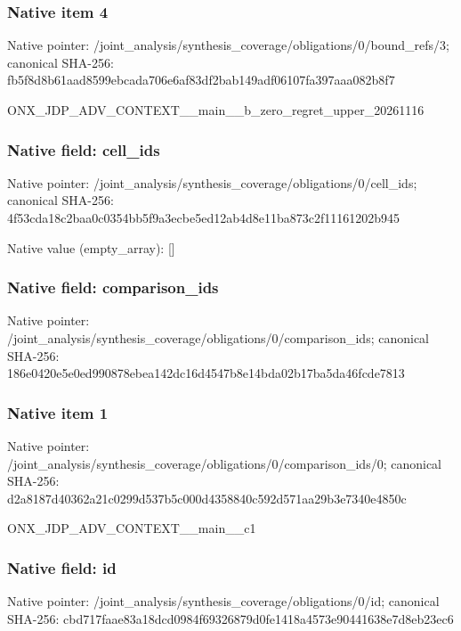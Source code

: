 \documentclass[10pt,a4paper]{article}
\begin{document}
\subsubsection{Native item 4}
Native pointer: /joint\_\allowbreak{}analysis/synthesis\_\allowbreak{}coverage/obligations/0/bound\_\allowbreak{}refs/3; canonical SHA-256: fb5f8d8b61aad8599ebcada706e6af83df2bab149adf06107fa397aaa082b8f7

\begingroup\raggedright\sloppy ONX\_\allowbreak{}JDP\_\allowbreak{}ADV\_\allowbreak{}CONTEXT\_\allowbreak{}\_\allowbreak{}main\_\allowbreak{}\_\allowbreak{}b\_\allowbreak{}zero\_\allowbreak{}regret\_\allowbreak{}upper\_\allowbreak{}20261116\par\endgroup

\subsubsection{Native field: cell\_\allowbreak{}ids}
Native pointer: /joint\_\allowbreak{}analysis/synthesis\_\allowbreak{}coverage/obligations/0/cell\_\allowbreak{}ids; canonical SHA-256: 4f53cda18c2baa0c0354bb5f9a3ecbe5ed12ab4d8e11ba873c2f11161202b945

Native value (empty\_\allowbreak{}array): []

\subsubsection{Native field: comparison\_\allowbreak{}ids}
Native pointer: /joint\_\allowbreak{}analysis/synthesis\_\allowbreak{}coverage/obligations/0/comparison\_\allowbreak{}ids; canonical SHA-256: 186e0420e5e0ed990878ebea142dc16d4547b8e14bda02b17ba5da46fcde7813

\subsubsection{Native item 1}
Native pointer: /joint\_\allowbreak{}analysis/synthesis\_\allowbreak{}coverage/obligations/0/comparison\_\allowbreak{}ids/0; canonical SHA-256: d2a8187d40362a21c0299d537b5c000d4358840c592d571aa29b3e7340e4850c

\begingroup\raggedright\sloppy ONX\_\allowbreak{}JDP\_\allowbreak{}ADV\_\allowbreak{}CONTEXT\_\allowbreak{}\_\allowbreak{}main\_\allowbreak{}\_\allowbreak{}c1\par\endgroup

\subsubsection{Native field: id}
Native pointer: /joint\_\allowbreak{}analysis/synthesis\_\allowbreak{}coverage/obligations/0/id; canonical SHA-256: cbd717faae83a18dcd0984f69326879d0fe1418a4573e90441638e7d8eb23ec6
\end{document}
